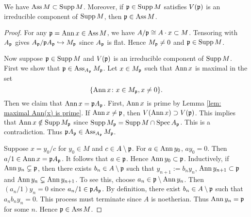         \begin{proposition}\label{prop: Ass is subset of Supp}
            We have $\operatorname{Ass} M \subset \operatorname{Supp} M$.
            Moreover, if ${\mathfrak{p}} \in \operatorname{Supp} M$ satisfies $V({\mathfrak{p}})$ is an irreducible component of $\operatorname{Supp} M$, then ${\mathfrak{p}} \in \operatorname{Ass} M$.
        \end{proposition}
        \begin{proof}
            For any ${\mathfrak{p}} = \operatorname{Ann} x \in \operatorname{Ass} M$, we have $A/{\mathfrak{p}} \cong A \cdot x \subset M$.
            Tensoring with $A_{\mathfrak{p}}$ gives $A_{\mathfrak{p}}/{\mathfrak{p}} A_{\mathfrak{p}} \hookrightarrow M_{\mathfrak{p}}$ since $A_{\mathfrak{p}}$ is flat.
            Hence $M_{\mathfrak{p}} \neq 0$ and ${\mathfrak{p}} \in \operatorname{Supp} M$.

            Now suppose ${\mathfrak{p}} \in \operatorname{Supp} M$ and $V({\mathfrak{p}})$ is an irreducible component of $\operatorname{Supp} M$.
            First we show that ${\mathfrak{p}} \in \operatorname{Ass}_{A_{\mathfrak{p}}} M_{\mathfrak{p}}$.
            Let $x \in M_{\mathfrak{p}}$ such that $\operatorname{Ann} x$ is maximal in the set 
            \[ \{ \operatorname{Ann} x \colon x \in M_{\mathfrak{p}}, x \neq 0 \}. \]
            Then we claim that $\operatorname{Ann} x = {\mathfrak{p}} A_{\mathfrak{p}}$.
            First, $\operatorname{Ann} x$ is prime by Lemma \ref{lem: maximal Ann(x) is prime}.
            If $\operatorname{Ann} x \neq {\mathfrak{p}}$, then $V(\operatorname{Ann} x) \supset V({\mathfrak{p}})$.
            This implies that $\operatorname{Ann} x \notin \operatorname{Supp} M_{\mathfrak{p}}$ since $\operatorname{Supp} M_{\mathfrak{p}} = \operatorname{Supp} M \cap \operatorname{Spec} A_{\mathfrak{p}}$.
            This is a contradiction.
            Thus ${\mathfrak{p}} A_{\mathfrak{p}} \in \operatorname{Ass}_{A_{\mathfrak{p}}} M_{\mathfrak{p}}$.

            Suppose $x = y_0/c$ for $y_0 \in M$ and $c \in A \setminus {\mathfrak{p}}$.
            For $a \in \operatorname{Ann} y_0$, $ay_0 = 0$.
            Then $a/1 \in \operatorname{Ann} x = {\mathfrak{p}} A_{\mathfrak{p}}$.
            It follows that $a \in {\mathfrak{p}}$.
            Hence $\operatorname{Ann} y_0 \subset {\mathfrak{p}}$.
            Inductively, if $\operatorname{Ann} y_n \subsetneq {\mathfrak{p}}$, then there exists $b_{n} \in A \setminus {\mathfrak{p}}$ 
            such that $y_{n+1}:=b_ny_n$, $\operatorname{Ann} y_{n+1} \subset {\mathfrak{p}}$ and $\operatorname{Ann} y_n \subsetneq \operatorname{Ann} y_{n+1}$.
            To see this, choose $a_n \in {\mathfrak{p}}\setminus \operatorname{Ann} y_n$.
            Then $(a_n/1) y_n = 0$ since $a_n/1 \in {\mathfrak{p}} A_{\mathfrak{p}}$.
            By definition, there exist $b_n \in A \setminus {\mathfrak{p}}$ such that $a_nb_ny_n = 0$.
            This process must terminate since $A$ is noetherian.
            Thus $\operatorname{Ann} y_n = {\mathfrak{p}}$ for some $n$.
            Hence ${\mathfrak{p}} \in \operatorname{Ass} M$.
        \end{proof}

